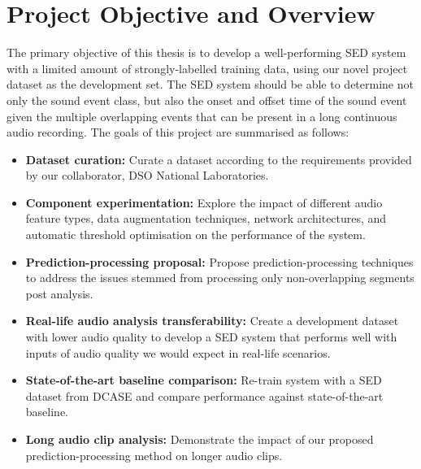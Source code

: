 \section{Project Objective and Overview}
The primary objective of this thesis is to develop a well-performing SED system with a limited amount of strongly-labelled training data, using our novel project dataset as the development set. The SED system should be able to determine not only the sound event class, but also the onset and offset time of the sound event given the multiple overlapping events that can be present in a long continuous audio recording. The goals of this project are summarised as follows:
\begin{itemize}
    \item{\textbf{Dataset curation:} Curate a dataset according to the requirements provided by our collaborator, DSO National Laboratories.}
    
    \item{\textbf{Component experimentation:} Explore the impact of different audio feature types, data augmentation techniques, network architectures, and automatic threshold optimisation on the performance of the system.}
    
    \item{\textbf{Prediction-processing proposal:} Propose prediction-processing techniques to address the issues stemmed from processing only non-overlapping segments post analysis.}
    
    \item{\textbf{Real-life audio analysis transferability:} Create a development dataset with lower audio quality to develop a SED system that performs well with inputs of audio quality we would expect in real-life scenarios.}
    
    \item{\textbf{State-of-the-art baseline comparison:} Re-train system with a SED dataset from DCASE and compare performance against state-of-the-art baseline.} %
    
    \item{\textbf{Long audio clip analysis:} Demonstrate the impact of our proposed prediction-processing method on longer audio clips.}
\end{itemize}

